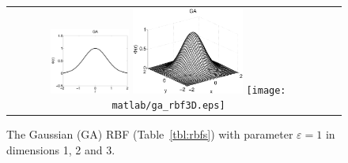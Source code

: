 \begin{figure}[t]
\centering
\begin{tabular}{cc}
\includegraphics[width=0.25\textwidth]{matlab/ga_rbf.pdf}
\includegraphics[width=0.35\textwidth]{matlab/ga_rbf2D.eps}
\texttt{[image: matlab/ga\_rbf3D.eps]}
\end{tabular} 
\caption{The Gaussian (GA) RBF (Table~\ref{tbl:rbfs}) with parameter $\varepsilon=1$ in dimensions 1, 2 and 3.}
\label{fig:rbf_dimension_example}
\end{figure} 